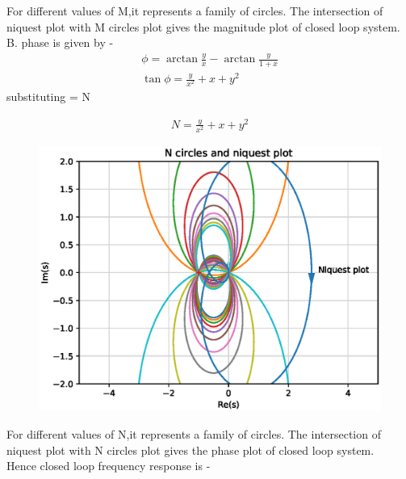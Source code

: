 \begin{enumerate}[label=\thesubsection.\arabic*.,ref=\thesubsection.\theenumi]
For different values of M,it represents a family of circles.
The intersection of niquest plot with M circles plot gives the magnitude plot of closed loop system.\\
B. phase is given by -
\begin{align}
    \phi = \arctan\frac{y}{x} - \arctan\frac{y}{1+x}\\
    \tan\phi = \frac{y}{x^2} + x + y^2
\end{align}
substituting \tan\phi = N 

\begin{align}
    N = \frac{y}{x^2} + x + y^2
\end{align}

\begin{figure}[!ht]
\includegraphics[width=\columnwidth]{./figs/ee18btech11027/N_circles.eps} 
\caption{}
\label{fig:ee18btech11027}
\end{figure}

For different values of N,it represents a family of circles.
The intersection of niquest plot with N circles plot gives the phase plot of closed loop system.\\

Hence closed loop frequency response is -


\end{enumerate}
